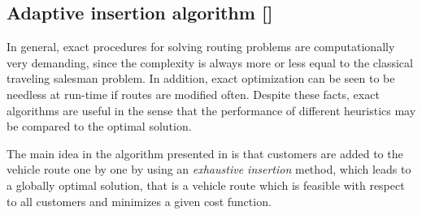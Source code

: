 \documentclass[dissertation,draft*]{aaltoseries}
\begin{document}
% 
% 


\subsection{Adaptive insertion algorithm []}
In general, exact procedures for solving routing  
problems are computationally very demanding, since the complexity is always more or 
less equal to the classical traveling salesman problem.
In addition, exact optimization can be seen to be needless at run-time if routes are modified often. 
Despite these facts, exact algorithms are useful in the sense that the 
performance of different heuristics may be compared to the optimal solution. 

The main idea in the algorithm presented in  is that customers are added to 
the vehicle route one by one by using an \emph{exhaustive insertion} method,
which leads to a globally optimal solution, that is a vehicle route 
which is feasible with respect to all customers and minimizes a given cost function. 
\end{document}
